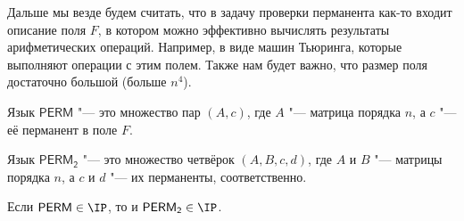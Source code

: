 	\begin{Rem}
		Дальше мы везде будем считать, что в задачу проверки перманента как-то входит описание поля $F$, в котором можно эффективно вычислять результаты арифметических операций.
		Например, в виде машин Тьюринга, которые выполняют операции с этим полем.
		Также нам будет важно, что размер поля достаточно большой (больше $n^4$).
	\end{Rem}
	\begin{Def}
		Язык $\mathsf{PERM}$ "--- это множество пар $(A, c)$, где $A$ "--- матрица порядка $n$, а $c$ "--- её перманент в поле $F$.
	\end{Def}
	\begin{Def}
		Язык $\mathsf{PERM_2}$ "--- это множество четвёрок $(A, B, c, d)$, где $A$ и $B$ "--- матрицы порядка $n$, а $c$ и $d$ "--- их перманенты, соответственно.
	\end{Def}
	\begin{lemma}
		Если $\mathsf{PERM}\in\IP$, то и $\mathsf{PERM_2} \in \IP$.
	\end{lemma}

